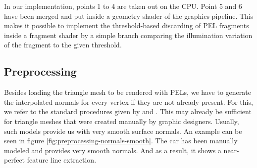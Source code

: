 \documentclass[9pt,fleqn,twoside,twocolumn]{stdglobal}
\begin{document}
    \noindent
    In our implementation, points 1 to 4 are taken out on the CPU.
    Point 5 and 6 have been merged and put inside a geometry shader of the graphics pipeline.
    This makes it possible to implement the threshold-based discarding of PEL fragments inside a fragment shader by a simple branch comparing the illumination variation of the fragment to the given threshold.

  \subsection{Preprocessing}
    Besides loading the triangle mesh to be rendered with PELs, we have to generate the interpolated normals for every vertex if they are not already present.
    For this, we refer to the standard procedures given by \textcite{max1999} and \textcite{jin2005}.
    This may already be sufficient for triangle meshes that were created manually by graphic designers.
    Usually, such models provide us with very smooth surface normals.
    An example can be seen in figure \ref{fig:preprocessing-normals-smooth}.
    The car has been manually modeled and provides very smooth normals.
    And as a result, it shows a  near-perfect feature line extraction.
\end{document}
